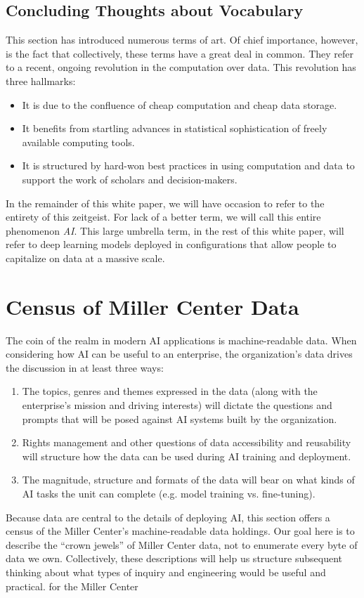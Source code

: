 \documentclass[12pt, oneside]{article}   	%
\begin{document}
 


\subsection{Concluding Thoughts about Vocabulary}\label{section.definitions.closing}
This section has introduced numerous terms of art.  Of chief importance, however, is the fact that collectively, these terms have a great deal in common.  They refer to a recent, ongoing revolution in the computation over data.  This revolution has three hallmarks:
\begin{itemize}
\item It is due to the confluence of cheap computation and cheap data storage.
\item It benefits from startling advances in statistical sophistication of freely available computing tools.
\item It is structured by hard-won best practices in using computation and data to support the work of scholars and decision-makers.
\end{itemize}
In the remainder of this white paper, we will have occasion to refer to the entirety of this zeitgeist.  For lack of a better term, we will call this entire phenomenon \emph{AI}.  This large umbrella term, in the rest of this white paper, will refer to deep learning models deployed in configurations that allow people to capitalize on data at a massive scale.


\section{Census of Miller Center Data}\label{secion.data}
The coin of the realm in modern AI applications is machine-readable data.  When considering how AI can be useful to an enterprise, the organization’s data drives the discussion in at least three ways:
\begin{enumerate}
\item The topics, genres and themes expressed in the data (along with the enterprise's mission and driving interests) will dictate the questions and prompts that will be posed against AI systems built by the organization.
\item Rights management and other questions of data accessibility and reusability will structure how the data can be used during AI training and deployment.
\item The magnitude, structure and formats of the data will bear on what kinds of AI tasks the unit can complete (e.g. model training vs. fine-tuning).
\end{enumerate}
Because data are central to the details of deploying AI, this section offers a census of the Miller Center’s machine-readable data holdings.  Our goal here is to describe the “crown jewels” of Miller Center data, not to enumerate every byte of data we own.  Collectively, these descriptions will help us structure subsequent thinking about what types of inquiry and engineering would be useful and practical. for the Miller Center
\end{document}
